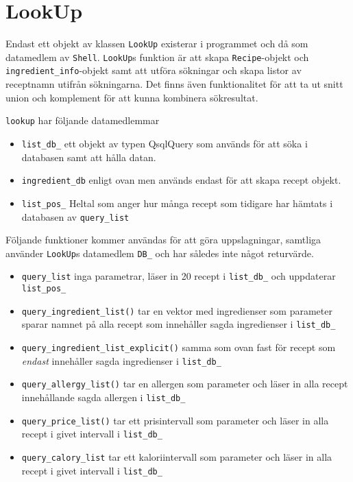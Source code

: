 \section{LookUp}
Endast ett objekt av klassen \verb+LookUp+ existerar i programmet och då som
datamedlem av \verb+Shell+. \verb+LookUp+s funktion är att skapa \verb+Recipe+-objekt och
\verb+ingredient_info+-objekt samt att utföra sökningar och skapa listor av
receptnamn utifrån sökningarna. Det finns även funktionalitet för att
ta ut snitt union och komplement för att kunna kombinera sökresultat.

\verb+lookup+ har följande datamedlemmar
\begin{itemize}
\item   \verb+list_db_+ ett objekt av typen QsqlQuery som används
        för att söka i databasen samt att hålla datan.
\item   \verb+ingredient_db+ enligt ovan men används endast för
        att skapa recept objekt.
\item   \verb+list_pos_+ Heltal som anger hur många recept som tidigare
        har hämtats i databasen av \verb+query_list+
\end{itemize}

Följande funktioner kommer användas för att göra uppslagningar,
samtliga använder \verb+LookUp+s datamedlem \verb+DB_+ och har således 
inte något returvärde. 

\begin{itemize}
\item   \verb+query_list+ inga parametrar, läser in 20 recept i \verb+list_db_+ 
        och uppdaterar \verb+list_pos_+

\item   \verb+query_ingredient_list()+ tar en vektor med ingredienser som
        parameter sparar namnet på alla recept som innehåller sagda ingredienser
        i \verb+list_db_+  

\item   \verb+query_ingredient_list_explicit()+ samma som ovan fast för recept som
        \emph{endast} innehåller sagda ingredienser i \verb+list_db_+  
   
\item   \verb+query_allergy_list()+ tar en allergen som parameter och läser in alla 
        recept innehållande sagda allergen i \verb+list_db_+  

\item   \verb+query_price_list()+ tar ett prisintervall som parameter och läser in
        alla recept i givet intervall i \verb+list_db_+  

\item   \verb+query_calory_list+ tar ett kaloriintervall som parameter och läser in
        alla recept i givet intervall i \verb+list_db_+  
\end{itemize}
 

